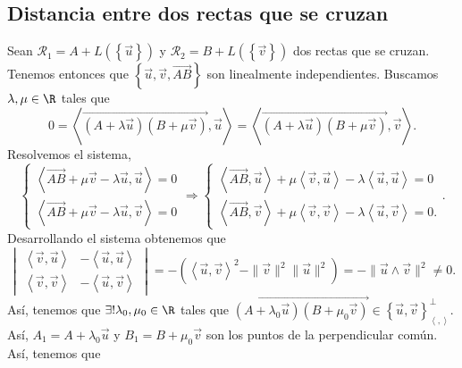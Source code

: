 \subsection*{Distancia entre dos rectas que se cruzan}
Sean $\displaystyle \mathcal{R}_{1} = A + L\left( \left\{ \vec{u}\right\} \right) $ y $\displaystyle \mathcal{R}_{2} = B + L\left( \left\{ \vec{v}\right\} \right) $ dos rectas que se cruzan. Tenemos entonces que $\displaystyle \left\{ \vec{u}, \vec{v}, \overrightarrow{AB}\right\}  $ son linealmente independientes. Buscamos $\displaystyle \lambda, \mu \in \R $ tales que 
\[0 = \left\langle \overrightarrow{\left(A + \lambda \vec{u}\right)\left(B + \mu \vec{v}\right)}, \vec{u} \right\rangle = \left\langle \overrightarrow{\left(A + \lambda \vec{u}\right)\left(B + \mu \vec{v}\right)}, \vec{v} \right\rangle   .\]
Resolvemos el sistema, 
\[
\begin{cases}
\left\langle \overrightarrow{AB}+\mu \vec{v} - \lambda \vec{u}, \vec{u} \right\rangle = 0 \\
\left\langle \overrightarrow{AB} + \mu \vec{v}-\lambda \vec{u}, \vec{v} \right\rangle = 0
\end{cases}
\Rightarrow 
	\begin{cases}
	
\left\langle \overrightarrow{AB}, \vec{u} \right\rangle + \mu \left\langle \vec{v}, \vec{u} \right\rangle -\lambda\left\langle \vec{u}, \vec{u} \right\rangle = 0 \\
\left\langle \overrightarrow{AB}, \vec{v} \right\rangle + \mu \left\langle \vec{v}, \vec{v} \right\rangle - \lambda \left\langle \vec{u}, \vec{v} \right\rangle = 0.
	\end{cases} 
.\]
Desarrollando el sistema obtenemos que 
\[ \begin{vmatrix} \left\langle \vec{v}, \vec{u} \right\rangle & - \left\langle \vec{u}, \vec{u} \right\rangle  \\ \left\langle \vec{v}, \vec{v} \right\rangle & -\left\langle \vec{u}, \vec{v} \right\rangle  \end{vmatrix}  = - \left(\left\langle \vec{u}, \vec{v} \right\rangle ^{2} - \|\vec{v}\|^{2} \|\vec{u}\|^{2}\right) = - \|\vec{u}\land \vec{v}\|^{2} \neq 0 .\]
Así, tenemos que $\displaystyle \exists ! \lambda_{0}, \mu_{0} \in \R $ tales que $\displaystyle \overrightarrow{\left(A + \lambda_{0}\vec{u}\right)\left(B + \mu_{0}\vec{v}\right)} \in \left\{ \vec{u}, \vec{v}\right\} ^{\perp }_{\left\langle ,  \right\rangle } $. Así, $\displaystyle A_{1} = A + \lambda_{0}\vec{u} $ y $\displaystyle B_{1} = B + \mu_{0}\vec{v} $ son los puntos de la perpendicular común. Así, tenemos que 
